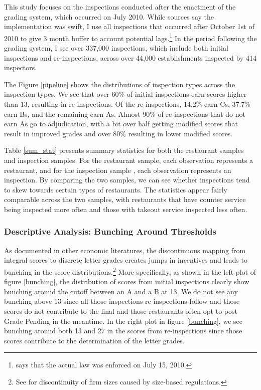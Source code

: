 \documentclass[12pt]{article}
\begin{document}
This study focuses on the inspections conducted after the enactment of the grading system, which occurred on July 2010. While sources say the implementation was swift, I use all inspections that occurred after October 1st of 2010 to give 3 month buffer to account potential lags.\footnote{\cite{Ho_2012} says that the actual law was enforced on July 15, 2010.} In the period following the grading system, I see over 337,000 inspections, which include both initial inspections and re-inspections, across over 44,000 establishments inspected by 414 inspectors. 

The Figure \ref{pipeline} shows the distributions of inspection types across the inspection types. We see that over 60\% of initial inspections earn scores higher than 13, resulting in re-inspections. Of the re-inspections, 14.2\% earn Cs, 37.7\% earn Bs, and the remaining earn As. Almost 90\% of re-inspections that do not earn As go to adjudication, with a bit over half getting modified scores that result in improved grades and over 80\% resulting in lower modified scores. 

Table \ref{sum_stat} presents summary statistics for both the restaurant samples and inspection samples. For the restaurant sample, each observation represents a restaurant, and for the inspection sample , each  observation represents an inspection. By comparing the two samples, we can see whether inspections tend to skew towards certain types of restaurants. The statistics appear fairly comparable across the two samples, with restaurants that have counter service being inspected more often and those with takeout service inspected less often. 

\subsubsection{Descriptive Analysis: Bunching Around Thresholds}

As documented in other economic literatures, the discontinuous mapping from integral scores to discrete letter grades creates jumps in incentives and leads to bunching in the score distributions.\footnote{See \cite{Gourio_Roys_14} for discontinuity of firm sizes caused by size-based regulations.} More specifically, as shown in the left plot of figure \ref{bunching}, the distribution of scores from initial inspections clearly show bunching around the cutoff between an A and a B at 13. We do not see any bunching above 13 since all those inspections re-inspections follow and those scores do not contribute to the final  and those restaurants often opt to post Grade Pending in the meantime. In the right plot in figure \ref{bunching}, we see bunching around both 13 and 27 in the scores from re-inspections since those scores contribute to the determination of the letter grades. 
\end{document}
